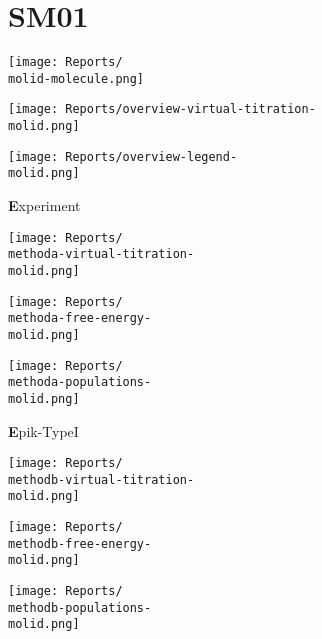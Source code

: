 \documentclass[9pt]{standalone}
\begin{document}
\newcommand{\molid}{SM01}
\newcommand{\methoda}{Experiment}
\newcommand{\methodb}{Epik-TypeI}
\newcommand{\methodc}{Jaguar-TypeI}
\newcommand{\methodd}{Epik-TypeII}
\newcommand{\methode}{Epik-TypeIII}
\section{\molid}
\noindent 
\begin{minipage}[s]{0.35\textwidth}\centering
\texttt{[image: Reports/\\molid-molecule.png]}
\end{minipage}
\begin{minipage}[s]{0.35\textwidth}
\texttt{[image: Reports/overview-virtual-titration-\\molid.png]}
\end{minipage}
\begin{minipage}[s]{0.23\textwidth}
\texttt{[image: Reports/overview-legend-\\molid.png]}
\end{minipage}

\begin{minipage}[s]{\textwidth}\centering
{\textbf \methoda}
\end{minipage}

\noindent
\begin{minipage}[s]{0.33\textwidth}\centering
\texttt{[image: Reports/\\methoda-virtual-titration-\\molid.png]}
\end{minipage}
\begin{minipage}[s]{0.33\textwidth}
\texttt{[image: Reports/\\methoda-free-energy-\\molid.png]}
\end{minipage}
\begin{minipage}[s]{0.33\textwidth}
\texttt{[image: Reports/\\methoda-populations-\\molid.png]}
\end{minipage}

\begin{minipage}[s]{\textwidth}\centering
{\textbf \methodb}
\end{minipage}

\noindent
\begin{minipage}[s]{0.33\textwidth}\centering
\texttt{[image: Reports/\\methodb-virtual-titration-\\molid.png]}
\end{minipage}
\begin{minipage}[s]{0.33\textwidth}
\texttt{[image: Reports/\\methodb-free-energy-\\molid.png]}
\end{minipage}
\begin{minipage}[s]{0.33\textwidth}
\texttt{[image: Reports/\\methodb-populations-\\molid.png]}
\end{minipage}
\end{document}
